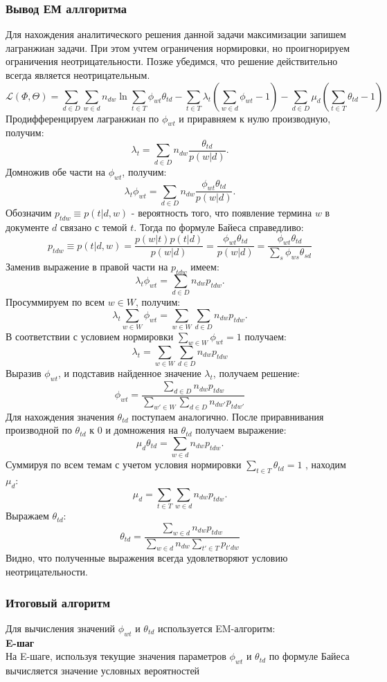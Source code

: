 \documentclass[12pt]{article}
\begin{document}
\subsubsection{Вывод ЕМ аллгоритма}
Для нахождения аналитического решения данной задачи максимизации запишем лагранжиан задачи. При этом учтем ограничения нормировки, но проигнорируем ограничения неотрицательности. Позже убедимся, что решение действительно всегда является неотрицательным.
\[
\mathcal {L}(\Phi,\Theta) = \sum_{d \in D}\sum_{w \in d}n_{dw}\ln\sum_{t \in T}\phi_{wt}\theta_{td}  - \sum_{t \in T}\lambda_t(\sum_{w \in d}\phi_{wt}-1) - \sum_{d \in D}\mu_d(\sum_{t \in T}\theta_{td} -1)  
\]
Продифференцируем лагранжиан по $\phi_{wt}$ и приравняем к нулю производную, получим:
\[
\lambda_t = \sum_{d \in D}n_{dw}\frac{\theta_{td}}{p(w|d)} .
\]
Домножив обе части на $\phi_{wt}$, получим:
\[
\lambda_t \phi_{wt}= \sum_{d \in D}n_{dw} \frac{\phi_{wt}\theta_{td}}{p(w|d)}.
\]
Обозначим $p_{tdw} \equiv p(t|d,w)$ - вероятность того, что появление термина $w$ в документе $d$ связано с темой $t$. Тогда по формуле Байеса справедливо:
\[
p_{tdw} \equiv p(t|d,w) = \frac {p(w|t)p(t|d)} {p(w|d)} = \frac {\phi_{wt}\theta_{td}} {p(w|d)} = \frac {\phi_{wt}\theta_{td}} {\sum_s\phi_{ws}\theta_{sd}}
\]
Заменив выражение в правой части на $p_{tdw}$ имеем:
\[
\lambda_t \phi_{wt}= \sum_{d \in D}n_{dw} p_{tdw} .
\]
Просуммируем по всем $w \in W$, получим:
\[
\lambda_t\sum_{w \in W} \phi_{wt}= \sum_{w \in W} \sum_{d \in D} n_{dw}p_{tdw} .
\]
В соответствии с условием нормировки $\sum_{w \in W} \phi_{wt} = 1$ получаем:
\[
\lambda_t = \sum_{w \in W} \sum_{d \in D}n_{dw} p_{tdw}
\]
Выразив $\phi_{wt}$, и подставив найденное значение $\lambda_t$, получаем решение:
\[
\phi_{wt} = \frac {\sum_{d \in D}n_{dw} p_{tdw} } {\sum_{w' \in W}  \sum_{d \in D}  n_{dw'}p_{tdw'} }
\]
Для нахождения значения $\theta_{td}$ поступаем аналогично. После приравнивания производной по $\theta_{td}$ к $0$ и домножения на $\theta_{td}$ получаем выражение:
\[
\mu_d \theta_{td}= \sum_{w \in d}n_{dw} p_{tdw} .
\]
Суммируя по всем темам с учетом условия нормировки $\sum_{t \in T} \theta_{td}  = 1$ , находим $\mu_d$:
\[
\mu_d= \sum_{t \in T} \sum_{w \in d} n_{dw}p_{tdw} .
\]
Выражаем $\theta_{td}$:
\[
\theta_{td} = \frac {\sum_{w \in d}n_{dw} p_{tdw} } { \sum_{w \in d}  n_{dw} \sum_{t' \in T} p_{t'dw} }
\]
Видно, что полученные выражения всегда удовлетворяют условию неотрицательности.\\
\subsubsection{Итоговый алгоритм}
Для вычисления значений $\phi_{wt}$ и $\theta_{td}$ используется EM-алгоритм:\\
\textbf{E-шаг}\\
На E-шаге, используя текущие значения параметров $\phi_{wt}$ и $\theta_{td}$ по формуле Байеса вычисляется значение условных вероятностей 
\end{document}

